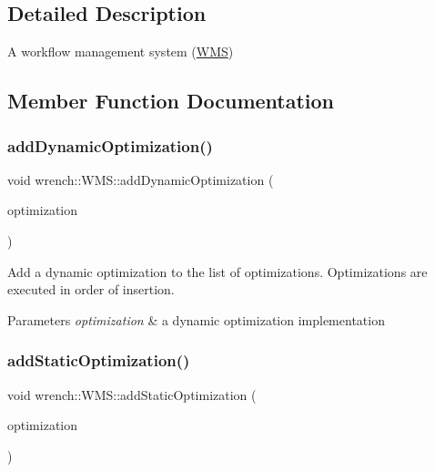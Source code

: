 \subsection{Detailed Description}
A workflow management system (\hyperlink{classwrench_1_1_w_m_s}{W\+MS}) 

\subsection{Member Function Documentation}
\mbox{\label{classwrench_1_1_w_m_s_a036f0865c72e8dfe4e40b9419f0dc735}} 
\subsubsection{\texorpdfstring{add\+Dynamic\+Optimization()}{addDynamicOptimization()}}
{\footnotesize\ttfamily void wrench\+::\+W\+M\+S\+::add\+Dynamic\+Optimization (\begin{DoxyParamCaption}\item[{std\+::unique\+\_\+ptr$<$ Dynamic\+Optimization $>$}]{optimization }\end{DoxyParamCaption})}



Add a dynamic optimization to the list of optimizations. Optimizations are executed in order of insertion. 


\begin{DoxyParams}{Parameters}
{\em optimization} & a dynamic optimization implementation \\
\hline
\end{DoxyParams}
\mbox{\label{classwrench_1_1_w_m_s_a21b9ae8ef40ba22e5ef0052fb70f7731}} 
\subsubsection{\texorpdfstring{add\+Static\+Optimization()}{addStaticOptimization()}}
{\footnotesize\ttfamily void wrench\+::\+W\+M\+S\+::add\+Static\+Optimization (\begin{DoxyParamCaption}\item[{std\+::unique\+\_\+ptr$<$ Static\+Optimization $>$}]{optimization }\end{DoxyParamCaption})}



